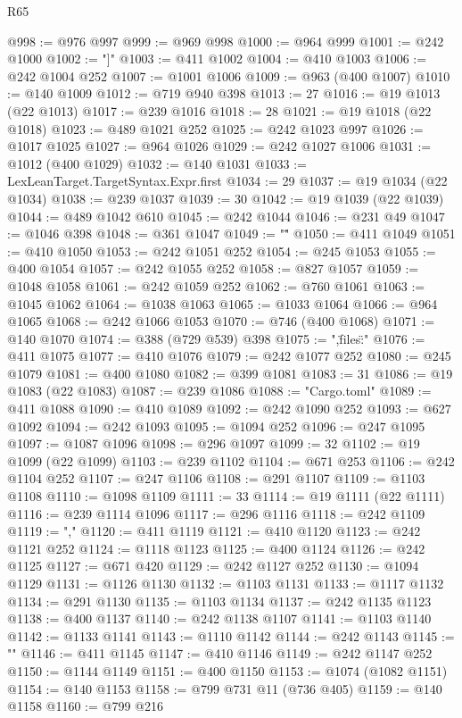 \begin{lexlean}{R65}
\begin{coremodule}
@998 := @976 @997
@999 := @969 @998
@1000 := @964 @999
@1001 := @242 @1000
@1002 := "]"
@1003 := @411 @1002
@1004 := @410 @1003
@1006 := @242 @1004 @252
@1007 := @1001 @1006
@1009 := @963 (@400 @1007)
@1010 := @140 @1009
@1012 := @719 @940 @398
@1013 := 27
@1016 := @19 @1013 (@22 @1013)
@1017 := @239 @1016
@1018 := 28
@1021 := @19 @1018 (@22 @1018)
@1023 := @489 @1021 @252
@1025 := @242 @1023 @997
@1026 := @1017 @1025
@1027 := @964 @1026
@1029 := @242 @1027 @1006
@1031 := @1012 (@400 @1029)
@1032 := @140 @1031
@1033 := LexLeanTarget.TargetSyntax.Expr.first
@1034 := 29
@1037 := @19 @1034 (@22 @1034)
@1038 := @239 @1037
@1039 := 30
@1042 := @19 @1039 (@22 @1039)
@1044 := @489 @1042 @610
@1045 := @242 @1044
@1046 := @231 @49
@1047 := @1046 @398
@1048 := @361 @1047
@1049 := "\""
@1050 := @411 @1049
@1051 := @410 @1050
@1053 := @242 @1051 @252
@1054 := @245 @1053
@1055 := @400 @1054
@1057 := @242 @1055 @252
@1058 := @827 @1057
@1059 := @1048 @1058
@1061 := @242 @1059 @252
@1062 := @760 @1061
@1063 := @1045 @1062
@1064 := @1038 @1063
@1065 := @1033 @1064
@1066 := @964 @1065
@1068 := @242 @1066 @1053
@1070 := @746 (@400 @1068)
@1071 := @140 @1070
@1074 := @388 (@729 @539) @398
@1075 := ",\"files\":{"
@1076 := @411 @1075
@1077 := @410 @1076
@1079 := @242 @1077 @252
@1080 := @245 @1079
@1081 := @400 @1080
@1082 := @399 @1081
@1083 := 31
@1086 := @19 @1083 (@22 @1083)
@1087 := @239 @1086
@1088 := "Cargo.toml"
@1089 := @411 @1088
@1090 := @410 @1089
@1092 := @242 @1090 @252
@1093 := @627 @1092
@1094 := @242 @1093
@1095 := @1094 @252
@1096 := @247 @1095
@1097 := @1087 @1096
@1098 := @296 @1097
@1099 := 32
@1102 := @19 @1099 (@22 @1099)
@1103 := @239 @1102
@1104 := @671 @253
@1106 := @242 @1104 @252
@1107 := @247 @1106
@1108 := @291 @1107
@1109 := @1103 @1108
@1110 := @1098 @1109
@1111 := 33
@1114 := @19 @1111 (@22 @1111)
@1116 := @239 @1114 @1096
@1117 := @296 @1116
@1118 := @242 @1109
@1119 := ","
@1120 := @411 @1119
@1121 := @410 @1120
@1123 := @242 @1121 @252
@1124 := @1118 @1123
@1125 := @400 @1124
@1126 := @242 @1125
@1127 := @671 @420
@1129 := @242 @1127 @252
@1130 := @1094 @1129
@1131 := @1126 @1130
@1132 := @1103 @1131
@1133 := @1117 @1132
@1134 := @291 @1130
@1135 := @1103 @1134
@1137 := @242 @1135 @1123
@1138 := @400 @1137
@1140 := @242 @1138 @1107
@1141 := @1103 @1140
@1142 := @1133 @1141
@1143 := @1110 @1142
@1144 := @242 @1143
@1145 := "}"
@1146 := @411 @1145
@1147 := @410 @1146
@1149 := @242 @1147 @252
@1150 := @1144 @1149
@1151 := @400 @1150
@1153 := @1074 (@1082 @1151)
@1154 := @140 @1153
@1158 := @799 @731 @11 (@736 @405)
@1159 := @140 @1158
@1160 := @799 @216

\end{coremodule}
\end{lexlean}

